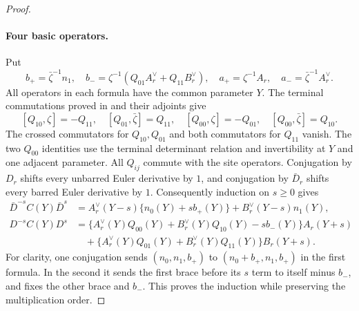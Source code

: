 \begin{proof}
\paragraph{Four basic operators.}
Put
\[
 b_+=\bar\zeta^{-1}n_1,\quad
 b_-=\zeta^{-1}(Q_{01}A_r^\vee+Q_{11}B_r^\vee),\quad
 a_+=\zeta^{-1}A_r,\quad a_-=\bar\zeta^{-1}A_r^\vee.
\]
All operators in each formula have the common parameter $Y$.
The terminal commutations proved in
and their adjoints give
\[
 [Q_{10},\zeta]=-Q_{11},\quad
 [Q_{01},\bar\zeta]=Q_{11},\quad
 [Q_{00},\zeta]=-Q_{01},\quad
 [Q_{00},\bar\zeta]=Q_{10}.
\]
The crossed commutators for $Q_{10},Q_{01}$ and both
commutators for $Q_{11}$ vanish.  The two $Q_{00}$ identities
use the terminal determinant relation and invertibility at
$Y$ and one adjacent parameter.  All $Q_{ij}$ commute with
the site operators.  Conjugation by $D_r$ shifts every
unbarred Euler derivative by $1$, and conjugation by
$\bar D_r$ shifts every barred Euler derivative by $1$.
Consequently induction on $s\ge0$ gives
\begin{align}
 \bar D^{-s}C(Y)\bar D^s
 &=A_r^\vee(Y-s)\{n_0(Y)+s b_+(Y)\}
                         +B_r^\vee(Y-s)n_1(Y),\label{actual-top-lift-conjplus}\\
 D^{-s}C(Y)D^s
 &=\{A_r^\vee(Y)Q_{00}(Y)+B_r^\vee(Y)Q_{10}(Y)-s b_-(Y)\}
                                                    A_r(Y+s)\nonumber\\
 &\quad+\{A_r^\vee(Y)Q_{01}(Y)+B_r^\vee(Y)Q_{11}(Y)\}
                                                    B_r(Y+s).
                                                    \label{actual-top-lift-conjminus}
\end{align}
For clarity, one conjugation sends $(n_0,n_1,b_+)$ to
$(n_0+b_+,n_1,b_+)$ in the first formula.  In the second
it sends the first brace before its $s$ term to itself
minus $b_-$, and fixes the other brace and $b_-$.  This
proves the induction while preserving the multiplication order.


\end{proof}
